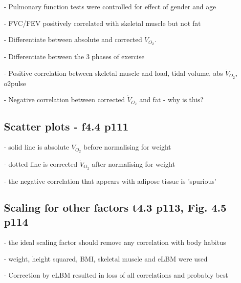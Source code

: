 \documentclass[12pt,a4paper]{article}
\begin{document}
- Pulmonary function tests were controlled for effect of gender and age

- FVC/FEV positively correlated with skeletal muscle but not fat

- Differentiate between absolute and corrected $\dot{V}_{O_2}$.

- Differentiate between the 3 phases of exercise

- Positive correlation between skeletal muscle and load, tidal volume, abs $\dot{V}_{O_2}$, o2pulse

- Negative correlation between corrected $\dot{V}_{O_2}$ and fat - why is this?

\subsection{Scatter plots - f4.4 p111}

- solid line is absolute $\dot{V}_{O_2}$ before normalising for weight

- dotted line is corrected $\dot{V}_{O_2}$ after normalising for weight

- the negative correlation that appears with adipose tissue is 'spurious'

\subsection{Scaling for other factors t4.3 p113, Fig. 4.5 p114}

- the ideal scaling factor should remove any correlation with body habitus

- weight, height squared, BMI, skeletal muscle and eLBM were used

- Correction by eLBM resulted in loss of all correlations and probably best


\clearpage
\end{document}
